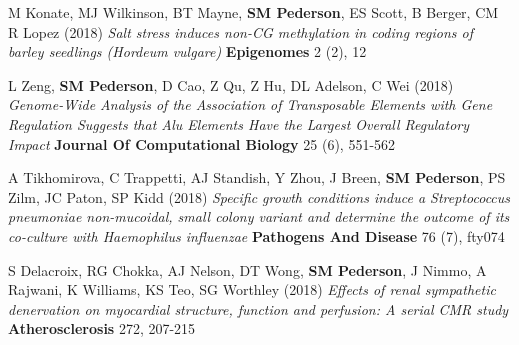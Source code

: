 \documentclass[11pt,a4paper,]{moderncv}
\begin{document}
\begin{modenumerate}
     \item M Konate, MJ Wilkinson, BT Mayne, \textbf{SM Pederson}, ES Scott, B Berger, CM R Lopez (2018) \emph{Salt stress induces non-CG methylation in coding regions of barley seedlings (Hordeum vulgare)} \textbf{Epigenomes} 2 (2), 12 \\[-4mm] 
     \item L Zeng, \textbf{SM Pederson}, D Cao, Z Qu, Z Hu, DL Adelson, C Wei (2018) \emph{Genome-Wide Analysis of the Association of Transposable Elements with Gene Regulation Suggests that Alu Elements Have the Largest Overall Regulatory Impact} \textbf{Journal Of Computational Biology} 25 (6), 551-562 \\[-4mm] 
     \item A Tikhomirova, C Trappetti, AJ Standish, Y Zhou, J Breen, \textbf{SM Pederson}, PS Zilm, JC Paton, SP Kidd (2018) \emph{Specific growth conditions induce a Streptococcus pneumoniae non-mucoidal, small colony variant and determine the outcome of its co-culture with Haemophilus influenzae} \textbf{Pathogens And Disease} 76 (7), fty074 \\[-4mm] 
     \item S Delacroix, RG Chokka, AJ Nelson, DT Wong, \textbf{SM Pederson}, J Nimmo, A Rajwani, K Williams, KS Teo, SG Worthley (2018) \emph{Effects of renal sympathetic denervation on myocardial structure, function and perfusion: A serial CMR study} \textbf{Atherosclerosis} 272, 207-215 \\[-4mm] 

\end{modenumerate}
\end{document}
